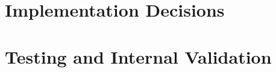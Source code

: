 \section{Implementation Decisions}
\label{sec:implementation_decisions}

\section{Testing and Internal Validation}
\label{sec:testing_and_validation}
